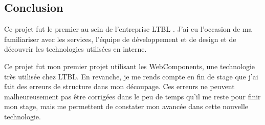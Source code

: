 \subsection{Conclusion}
\label{bmxconclusion}

Ce projet fut le premier au sein de l'entreprise LTBL .
J'ai eu l'occasion de ma familiariser avec les services, l'équipe de développement et de design et de découvrir les technologies utilisées en interne.

Ce projet fut mon premier projet utilisant les WebComponents, une technologie très utilisée chez LTBL.
En revanche, je me rends compte en fin de stage que j'ai fait des erreurs de structure dans mon découpage.
Ces erreurs ne peuvent malheureusement pas être corrigées dans le peu de temps qu'il me reste pour finir mon stage, mais me permettent de constater mon avancée dans cette nouvelle technologie.

